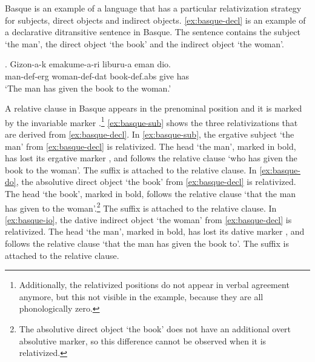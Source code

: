 %



Basque is an example of a language that has a particular relativization strategy for subjects, direct objects and indirect objects. \ref{ex:basque-decl} is an example of a declarative ditransitive sentence in Basque. The sentence contains the subject  `the man', the direct object  `the book' and the indirect object  `the woman'.

\exg. Gizon-a-k emakume-a-ri liburu-a eman dio.\\
 man-\ac{def}-\ac{erg} woman-\ac{def}-\ac{dat} book-\ac{def}.\ac{abs} give has\\
 `The man has given the book to the woman.' \label{ex:basque-decl}

A relative clause in Basque appears in the prenominal position and it is marked by the invariable marker .\footnote{
Additionally, the relativized positions do not appear in verbal agreement anymore, but this not visible in the example, because they are all phonologically zero.
}
\ref{ex:basque-sub} shows the three relativizations that are derived from \ref{ex:basque-decl}.
In \ref{ex:basque-sub}, the ergative subject  `the man' from \ref{ex:basque-decl} is relativized. The head  `the man', marked in bold, has lost its ergative marker , and follows the relative clause  `who has given the book to the woman'. The suffix  is attached to the relative clause.
In \ref{ex:basque-do}, the absolutive direct object  `the book' from \ref{ex:basque-decl} is relativized. The head  `the book', marked in bold, follows the relative clause  `that the man has given to the woman'.\footnote{
The absolutive direct object  `the book' does not have an additional overt absolutive marker, so this difference cannot be observed when it is relativized.
}
The suffix  is attached to the relative clause.
In \ref{ex:basque-io}, the dative indirect object  `the woman' from \ref{ex:basque-decl} is relativized. The head  `the man', marked in bold, has lost its dative marker , and follows the relative clause  `that the man has given the book to'. The suffix  is attached to the relative clause.

